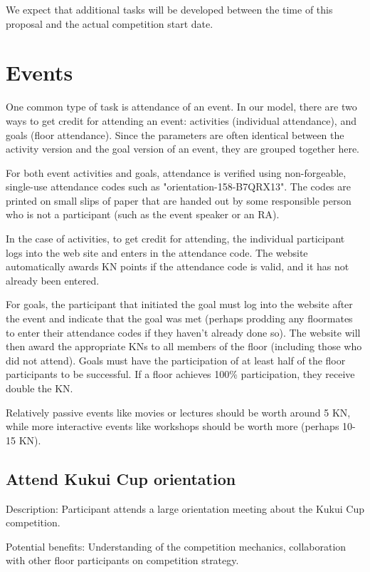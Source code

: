 We expect that additional tasks will be developed between the time of this proposal and the actual competition start date.


\section{Events}

One common type of task is attendance of an event. In our model, there are two ways to get credit for attending an event: activities (individual attendance), and goals (floor attendance). Since the parameters are often identical between the activity version and the goal version of an event, they are grouped together here.

For both event activities and goals, attendance is verified using non-forgeable, single-use attendance codes such as "orientation-158-B7QRX13". The codes are printed on small slips of paper that are handed out by some responsible person who is not a participant (such as the event speaker or an RA).

In the case of activities, to get credit for attending, the individual participant logs into the web site and enters in the attendance code. The website automatically awards KN points if the attendance code is valid, and it has not already been entered.

For goals, the participant that initiated the goal must log into the website after the event and indicate that the goal was met (perhaps prodding any floormates to enter their attendance codes if they haven't already done so). The website will then award the appropriate KNs to all members of the floor (including those who did not attend). Goals must have the participation of at least half of the floor participants to be successful. If a floor achieves 100\% participation, they receive double the KN.

Relatively passive events like movies or lectures should be worth around 5 KN, while more interactive events like workshops should be worth more (perhaps 10-15 KN).

\subsection{Attend Kukui Cup orientation}

Description: Participant attends a large orientation meeting about the Kukui Cup competition.

Potential benefits: Understanding of the competition mechanics, collaboration with other floor participants on competition strategy.

